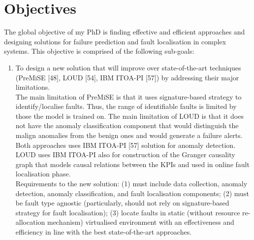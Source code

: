 \documentclass[]{usiinfprospectus}
\begin{document}
\section{Objectives}
The global objective of my PhD is finding effective and efficient approaches and designing solutions for failure prediction and fault localisation in complex systems. This objective is comprised of the following sub-goals:
\begin{enumerate}
   \item To design a new solution that will improve over state-of-the-art techniques (PreMiSE [48], LOUD [54], IBM ITOA-PI [57]) by addressing their major limitations.\\
%
The main limitation of  PreMiSE is that it uses signature-based strategy to identify/localise faults. Thus, the range of identifiable faults is limited by those the model is trained on. The main limitation of LOUD is that it does not have the anomaly classification component that would distinguish the malign anomalies from the benign ones and would generate a failure alerts. Both approaches uses IBM ITOA-PI [57] solution for anomaly detection. LOUD uses IBM ITOA-PI also for construction of the Granger causality graph that models causal relations between the KPIs and used in online fault localisation phase.\\
%
Requirements to the new solution: (1) must include data collection, anomaly detection, anomaly classification, and fault localisation components; (2) must be fault type agnostic (particularly, should not rely on signature-based strategy for fault localisation); (3) locate faults in static (without resource re-allocation mechanism) virtualised environment with an effectiveness and efficiency in line with the best state-of-the-art approaches.\\

\end{enumerate}
\end{document}

